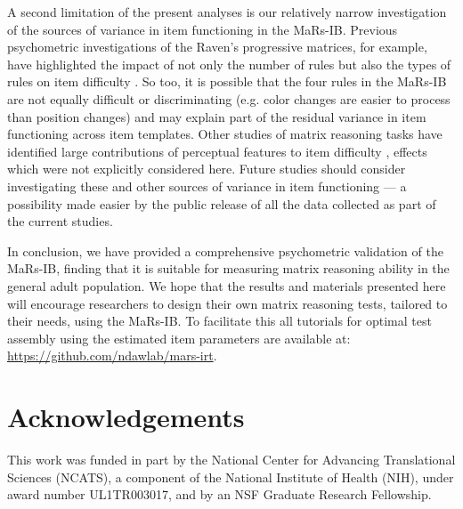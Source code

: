 \documentclass[a4paper,man,natbib]{apa6}
\begin{document}
A second limitation of the present analyses is our relatively narrow investigation of the sources of variance in item functioning in the MaRs-IB. Previous psychometric investigations of the Raven's progressive matrices, for example, have highlighted the impact of not only the number of rules but also the types of rules on item difficulty \citep{carpenter1990one, embretson1998cognitive}. So too, it is possible that the four rules in the MaRs-IB are not equally difficult or discriminating (e.g. color changes are easier to process than position changes) and may explain part of the residual variance in item functioning across item templates. Other studies of matrix reasoning tasks have identified large contributions of perceptual features to item difficulty \citep{primi2001complexity, primi2014developing}, effects which were not explicitly considered here. Future studies should consider investigating these and other sources of variance in item functioning --- a possibility made easier by the public release of all the data collected as part of the current studies.

In conclusion, we have provided a comprehensive psychometric validation of the MaRs-IB, finding that it is suitable for measuring matrix reasoning ability in the general adult population. We hope that the results and materials presented here will encourage researchers to design their own matrix reasoning tests, tailored to their needs, using the MaRs-IB. To facilitate this all tutorials for optimal test assembly using the estimated item parameters are available at: \url{https://github.com/ndawlab/mars-irt}.

\section{Acknowledgements}
\noindent This work was funded in part by the National Center for Advancing Translational Sciences (NCATS), a component of the National Institute of Health (NIH), under award number UL1TR003017, and by an NSF Graduate Research Fellowship.


\end{document}

